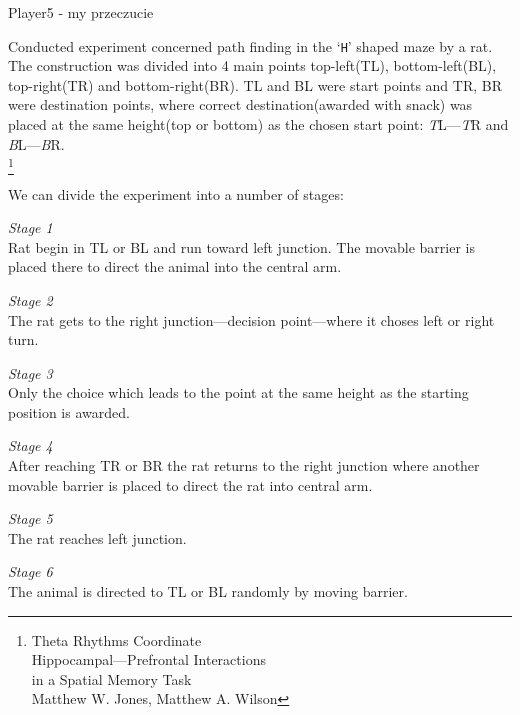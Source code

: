 \documentclass[12pt,a4paper,twocolumn]{article}
\begin{document}
Player5 - my przeczucie



Conducted experiment concerned path finding in the `\texttt{H}' shaped maze by a rat. The construction was divided into 4 main points top-left(TL), bottom-left(BL), top-right(TR) and bottom-right(BR). TL and BL were start points and TR, BR were destination points, where correct destination(awarded with snack) was placed at the same height(top or bottom) as the chosen start point: \emph{T}L---\emph{T}R and \emph{B}L---\emph{B}R.\\
\let\thefootnote\relax\footnote{Theta Rhythms Coordinate\\Hippocampal–--Prefrontal Interactions\\in a Spatial Memory Task\\Matthew W. Jones, Matthew A. Wilson}


We can divide the experiment into a number of stages:
\begin{description}
\item{\emph{Stage 1}} \hfill\\
Rat begin in TL or BL and run toward left junction. The movable barrier is placed there to direct the animal into the central arm.
\item{\emph{Stage 2}} \hfill\\
The rat gets to the right junction---decision point---where it choses left or right turn.
\item{\emph{Stage 3}} \hfill\\
Only the choice which leads to the point at the same height as the starting position is awarded.
\item{\emph{Stage 4}} \hfill\\
After reaching TR or BR the rat returns to the right junction where another movable barrier is placed to direct the rat into central arm.
\item{\emph{Stage 5}} \hfill\\
The rat reaches left junction.
\item{\emph{Stage 6}} \hfill\\
The animal is directed to TL or BL randomly by moving barrier.
\end{description}
\end{document}

